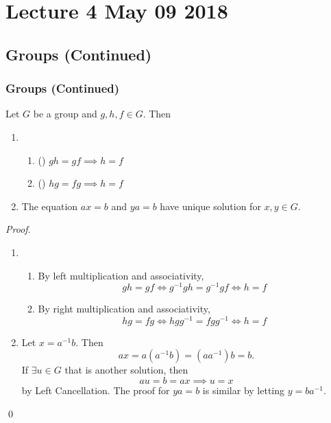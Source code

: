 \chapter{Lecture 4 May 09 2018}
  \label{chapter:lecture_4_may_09_2018}

\section{Groups (Continued)} %
\label{sec:groups_continued}

\subsection{Groups (Continued)} %
\label{sub:groups_continued}

\begin{propo}\label{propo:cancellation_laws}
  Let $G$ be a group and $g, h, f \in G$. Then
  \begin{enumerate}
    \item \begin{enumerate}
        \item () $gh = gf \implies h = f$
        \item () $hg = fg \implies h = f$
      \end{enumerate}
    \item The equation $ax = b$ and $ya = b$ have unique solution for $x, y \in G$.
  \end{enumerate}
\end{propo}

\begin{proof}
  \begin{enumerate}
    \item \begin{enumerate}
      \item By left multiplication and associativity,
        \begin{equation*}
          gh = gf \iff g^{-1} gh = g^{-1} gf \iff h = f
        \end{equation*}
      \item By right multiplication and associativity,
        \begin{equation*}
          hg = fg \iff hgg^{-1} = fgg^{-1} \iff h = f
        \end{equation*}
    \end{enumerate}

    \item Let $x = a^{-1} b$. Then
      \begin{equation*}
        a x = a (a^{-1} b) = (aa^{-1}) b = b.
      \end{equation*}
      If $\exists u \in G$ that is another solution, then
      \begin{equation*}
        au = b = ax \implies u = x
      \end{equation*}
      by Left Cancellation. The proof for $ya = b$ is similar by letting $y = ba^{-1}$.
  \end{enumerate}\qed
\end{proof}

